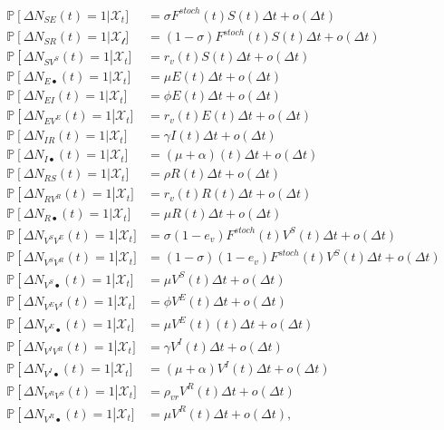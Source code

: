 \begin{gather}
\label{eq:stochsys}
\begin{aligned}
    \mathbb{P}\left[ \Delta N_{SE}(t) = 1 \right|\mathcal{X}_t] &= \sigma F^{stoch}(t) S(t) \Delta t + o(\Delta t)\\
    \mathbb{P}\left[ \Delta N_{SR}(t) = 1 \right|\mathcal{X_t}] &= (1-\sigma) F^{stoch}(t) S(t) \Delta t + o(\Delta t)\\
    \mathbb{P}\left[ \Delta N_{SV^S}(t) = 1 \right|\mathcal{X}_t] &= r_v(t) S(t) \Delta t + o(\Delta t)\\
    \mathbb{P}\left[ \Delta N_{E\bullet}(t) = 1 \right|\mathcal{X}_t] &= \mu  E(t) \Delta t + o(\Delta t)\\
    \mathbb{P}\left[ \Delta N_{EI}(t) = 1 \right|\mathcal{X}_t] &= \phi E(t) \Delta t + o(\Delta t)\\
    \mathbb{P}\left[ \Delta N_{EV^E}(t) = 1 \right|\mathcal{X}_t] &= r_v(t) E(t) \Delta t + o(\Delta t)\\
    \mathbb{P}\left[ \Delta N_{IR}(t) = 1 \right|\mathcal{X}_t] &= \gamma I(t) \Delta t + o(\Delta t)\\
    \mathbb{P}\left[ \Delta N_{I\bullet}(t) = 1 \right|\mathcal{X}_t] &= (\mu+\alpha)(t) \Delta t + o(\Delta t)\\
    \mathbb{P}\left[ \Delta N_{RS}(t) = 1 \right|\mathcal{X}_t] &= \rho R(t) \Delta t + o(\Delta t)\\
    \mathbb{P}\left[ \Delta N_{RV^R}(t) = 1 \right|\mathcal{X}_t] &= r_v(t) R(t) \Delta t + o(\Delta t)\\
    \mathbb{P}\left[ \Delta N_{R\bullet}(t) = 1 \right|\mathcal{X}_t] &= \mu R(t) \Delta t + o(\Delta t)\\
    \mathbb{P}\left[ \Delta N_{V^SV^E}(t) = 1 \right|\mathcal{X}_t] &=  \sigma (1-e_v) F^{stoch}(t) V^S(t) \Delta t + o(\Delta t)\\
    \mathbb{P}\left[ \Delta N_{V^SV^R}(t) = 1 \right|\mathcal{X}_t] &=  (1-\sigma) (1-e_v) F^{stoch}(t) V^S(t) \Delta t + o(\Delta t)\\
    \mathbb{P}\left[ \Delta N_{V^S\bullet}(t) = 1 \right|\mathcal{X}_t] &= \mu V^S(t) \Delta t + o(\Delta t)\\
    \mathbb{P}\left[ \Delta N_{V^EV^I}(t) = 1 \right|\mathcal{X}_t] &= \phi V^E(t) \Delta t + o(\Delta t)\\
    \mathbb{P}\left[ \Delta N_{V^E\bullet}(t) = 1 \right|\mathcal{X}_t] &= \mu V^E(t)(t) \Delta t + o(\Delta t)\\
    \mathbb{P}\left[ \Delta N_{V^IV^R}(t) = 1 \right|\mathcal{X}_t] &= \gamma V^I(t) \Delta t + o(\Delta t)\\
    \mathbb{P}\left[ \Delta N_{V^I\bullet}(t) = 1 \right|\mathcal{X}_t] &= (\mu+\alpha)V^I(t) \Delta t + o(\Delta t)\\
    \mathbb{P}\left[ \Delta N_{V^RV^S}(t) = 1 \right|\mathcal{X}_t] &= \rho_{vr} V^R(t) \Delta t + o(\Delta t)\\
    \mathbb{P}\left[ \Delta N_{V^R\bullet}(t) = 1 \right|\mathcal{X}_t] &= \mu V^R(t) \Delta t + o(\Delta t),\\
\end{aligned}
\end{gather}

